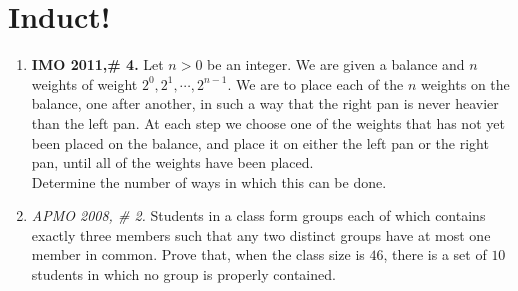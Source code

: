 \documentclass[11pt,a4paper]{article}
\begin{document}
\section{Induct!}
\begin{enumerate}
\item\textbf {IMO 2011,\# 4.} Let $n > 0$ be an integer. We are given a balance and $n$ weights of weight $2^0, 2^1, \cdots, 2^{n-1}$. We are to place each of the $n$ weights on the balance, one after another, in such a way that the right pan is never heavier than the left pan. At each step we choose one of the weights that has not yet been placed on the balance, and place it on either the left pan or the right pan, until all of the weights have been placed.\\
Determine the number of ways in which this can be done.

\item\emph {APMO 2008, \# 2.} Students in a class form groups each of which contains exactly three members such that any two distinct groups have at most one member in common. Prove that, when the class size is $ 46$, there is a set of $ 10$ students in which no group is properly contained.
\end{enumerate}
\end{document}
